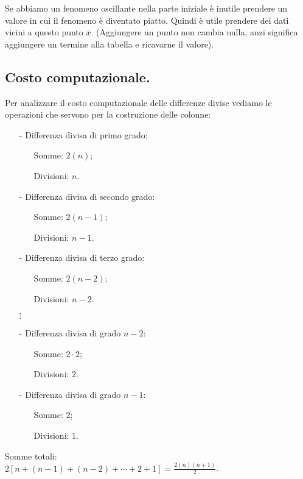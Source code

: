 Se abbiamo un fenomeno oscillante nella parte iniziale è inutile prendere un
valore in cui il fenomeno è diventato piatto. Quindi è utile prendere dei
dati vicini a questo punto $\overline{x}$. (Aggiungere un punto non cambia
nulla, anzi significa aggiungere un termine alla tabella e ricavarne il
valore).

\subsection{Costo computazionale.}
Per analizzare il costo computazionale delle differenze divise vediamo le
operazioni che servono per la costruzione delle colonne:
\begin{itemize}
\item[-]Differenza divisa di primo grado:
  \begin{itemize}
  \item[]Somme: $2(n)$;
  \item[]Divisioni: $n$.
  \end{itemize}
\item[-]Differenza divisa di secondo grado:
  \begin{itemize}
  \item[]Somme: $2(n-1)$;
  \item[]Divisioni: $n-1$.
  \end{itemize}
\item[-]Differenza divisa di terzo grado:
  \begin{itemize}
  \item[]Somme: $2(n-2)$;
  \item[]Divisioni: $n-2$.
  \end{itemize}
\item[]$\vdots$
\item[-]Differenza divisa di grado $n-2$:
  \begin{itemize}
  \item[]Somme: $2 \cdot 2$;
  \item[]Divisioni: $2$.
  \end{itemize}
\item[-]Differenza divisa di grado $n-1$:
  \begin{itemize}
  \item[]Somme: $2$;
  \item[]Divisioni: $1$.
  \end{itemize}
\end{itemize}

Somme totali:\\
$2[n+(n-1)+(n-2)+ \cdots + 2 + 1] = \frac{2(n)(n+1)}{2}$.\\

